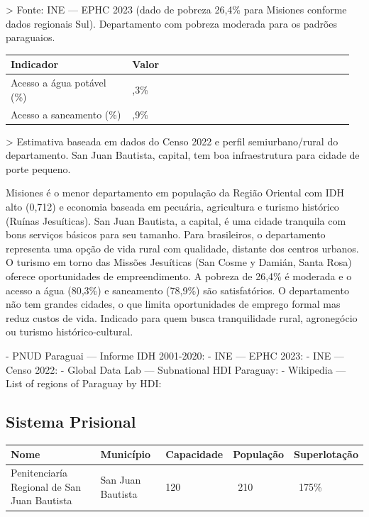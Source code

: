 > Fonte: INE --- EPHC 2023 (dado de pobreza 26,4\% para Misiones conforme dados regionais Sul). Departamento com pobreza moderada para os padrões paraguaios.


{\small
\setlength{\tabcolsep}{3pt}
\renewcommand{\arraystretch}{1.12}
\begin{tabularx}{\linewidth}{>{\raggedright\arraybackslash}p{0.34\linewidth} >{\raggedright\arraybackslash}p{0.62\linewidth}}
\toprule
Indicador & Valor \\
\midrule
Acesso a água potável (\%) & 80,3\% \\
Acesso a saneamento (\%) & 78,9\% \\
\bottomrule
\end{tabularx}
}

> Estimativa baseada em dados do Censo 2022 e perfil semiurbano/rural do departamento. San Juan Bautista, capital, tem boa infraestrutura para cidade de porte pequeno.


Misiones é o menor departamento em população da Região Oriental com IDH alto (0,712) e economia baseada em pecuária, agricultura e turismo histórico (Ruínas Jesuíticas). San Juan Bautista, a capital, é uma cidade tranquila com bons serviços básicos para seu tamanho. Para brasileiros, o departamento representa uma opção de vida rural com qualidade, distante dos centros urbanos. O turismo em torno das Missões Jesuíticas (San Cosme y Damián, Santa Rosa) oferece oportunidades de empreendimento. A pobreza de 26,4\% é moderada e o acesso a água (80,3\%) e saneamento (78,9\%) são satisfatórios. O departamento não tem grandes cidades, o que limita oportunidades de emprego formal mas reduz custos de vida. Indicado para quem busca tranquilidade rural, agronegócio ou turismo histórico-cultural.


- PNUD Paraguai --- Informe IDH 2001-2020: 
- INE --- EPHC 2023: 
- INE --- Censo 2022: 
- Global Data Lab --- Subnational HDI Paraguay: 
- Wikipedia --- List of regions of Paraguay by HDI: 


\subsection{Sistema Prisional}



{\small
\setlength{\tabcolsep}{3pt}
\renewcommand{\arraystretch}{1.12}
{\small
\begin{tabularx}{\linewidth}{lXXXX}
\toprule
Nome & Município & Capacidade & População & Superlotação \\
\midrule
Penitenciaría Regional de San Juan Bautista & San Juan Bautista & 120 & ~210 & ~175\% \\
\bottomrule
\end{tabularx}
}
}


